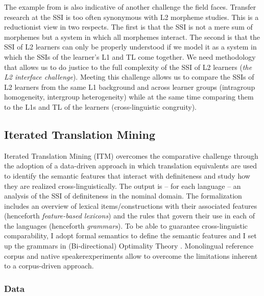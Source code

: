 \documentclass[output=paper,
modfonts
]{langscibook}
\begin{document}
The example from \citet{SnapeLeungTing2006} is also indicative of another challenge the field faces. Transfer research at the SSI is too often synonymous with L2 morpheme studies. This is a reductionist view in two respects. The first is that the SSI is not a mere sum of morphemes but a system in which all morphemes interact. The second is that the SSI of L2 learners can only be properly understood if we model it as a system in which the SSIs of the learner’s L1 and TL come together. We need methodology that allows us to do justice to the full complexity of the SSI of L2 learners (\textit{the L2 interface challenge}). Meeting this challenge allows us to compare the SSIs of L2 learners from the same L1 background and across learner groups (intragroup homogeneity, intergroup heterogeneity) while at the same time comparing them to the L1s and TL of the learners (cross-linguistic congruity).

\subsection{Iterated Translation Mining}

Iterated Translation Mining (ITM) overcomes the comparative challenge through the adoption of a data-driven approach in which translation equivalents are used to identify the semantic features that interact with definiteness and study how they are realized cross-linguistically. The output is -- for each language -- an analysis of the SSI of definiteness in the nominal domain. The formalization includes an overview of lexical items/constructions with their associated features (henceforth \textit{feature-based lexicons}) and the rules that govern their use in each of the languages (henceforth \textit{grammars}). To be able to guarantee cross-linguistic comparability, I adopt formal semantics to define the semantic features and I set up the grammars in (Bi-directional) Optimality Theory \citep{PrinceSmolensky2004,Hendriksetal2010}. Monolingual reference corpus and native speaker\largerpage experiments allow to overcome the limitations inherent to a corpus-driven approach.
\subsubsection{Data}
\end{document}
